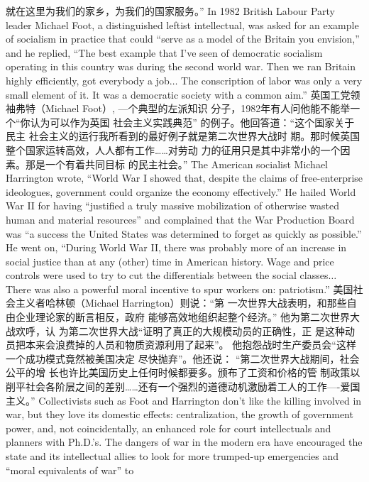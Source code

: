 \begin{paracol}{2}
就在这里为我们的家乡，为我们的国家服务。”
\switchcolumn*
In 1982 British Labour Party leader Michael Foot, a distinguished leftist intellectual, was asked for an example of socialism
in practice that could ``serve as a model of the Britain you envision,'' and he replied, ``The best example that I've seen of democratic socialism operating in this country was during the second
world war. Then we ran Britain highly efficiently, got everybody
a job$\ldots$ The conscription of labor was only a very small element of it. It was a democratic society with a common aim.''
\switchcolumn
英国工党领袖弗特（Michael Foot）, ---个典型的左派知识
分子，1982年有人问他能不能举一个“你认为可以作为英国
社会主义实践典范” 的例子。他回答道：“这个国家关于民主
社会主义的运行我所看到的最好例子就是第二次世界大战时
期。那时候英国整个国家运转高效，人人都有工作……对劳动
力的征用只是其中非常小的一个因素。那是一个有着共同目标
的民主社会。”
\switchcolumn*
The American socialist Michael Harrington wrote, ``World
War I showed that, despite the claims of free-enterprise ideologues, government could organize the economy effectively.''
He hailed World War II for having ``justified a truly massive
mobilization of otherwise wasted human and material resources'' and complained that the War Production Board was
``a success the United States was determined to forget as
quickly as possible.'' He went on, ``During World War II, there
was probably more of an increase in social justice than at any
(other) time in American history. Wage and price controls were
used to try to cut the differentials between the social
classes$\ldots$ There was also a powerful moral incentive to spur
workers on: patriotism.''
\switchcolumn
美国社会主义者哈林顿（Michael Harrington）则说：“第
一次世界大战表明，和那些自由企业理论家的断言相反，政府
能够高效地组织起整个经济。” 他为第二次世界大战欢呼，认
为第二次世界大战“证明了真正的大规模动员的正确性，正
是这种动员把本来会浪费掉的人员和物质资源利用了起来”。
他抱怨战时生产委员会“这样一个成功模式竟然被美国决定
尽快抛弃”。他还说： “第二次世界大战期间，社会公平的增
长也许比美国历史上任何时候都要多。颁布了工资和价格的管
制政策以削平社会各阶层之间的差别……还有一个强烈的道德动机激励着工人的工作----爱国主义。”
\switchcolumn*
Collectivists such as Foot and Harrington don't like the
killing involved in war, but they love its domestic effects: centralization, the growth of government power, and, not coincidentally, an enhanced role for court intellectuals and planners
with Ph.D.'s. The dangers of war in the modern era have encouraged the state and its intellectual allies to look for more
trumped-up emergencies and ``moral equivalents of war'' to

\end{paracol}
